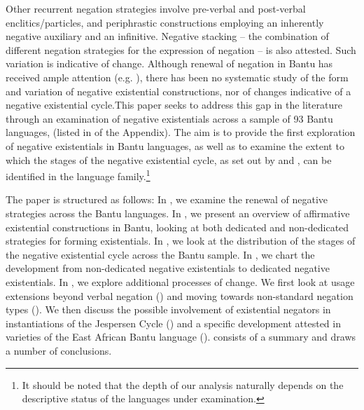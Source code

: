 \documentclass[output=paper,draft,draftmode,colorlinks,citecolor=brown]{langscibook}
\begin{document}
Other recurrent negation strategies involve pre-verbal and post-verbal
enclitics/particles, and periphrastic constructions employing an inherently
negative auxiliary and an infinitive. Negative stacking -- the combination
of different negation strategies for the expression of negation -- is also
attested. Such variation is indicative of change. Although renewal of
negation in Bantu has received ample attention (e.g.
\citealt{KambaMuzenga1981,Guldemann1996,Guldemann1999,DevosAuwera2013,DevosOlmen2013}), there has been no systematic study of the
form and variation of negative existential constructions, nor of changes
indicative of a negative existential cycle.This paper seeks
to address this gap in the literature through an examination of negative
existentials across a sample of 93 Bantu languages, (listed  in  of the Appendix). The aim is to provide
the first exploration of negative existentials in Bantu languages, as well
as to examine the extent to which the stages of the negative existential
cycle, as set out by \citet{Croft1991} and
\citet{Veselinova2016}, can be identified in the
language family.\footnote{It should be noted that the depth of our analysis
naturally depends on the descriptive status of the languages under
examination.}

The paper is structured as follows: In ,
 we examine the renewal of negative strategies across the Bantu languages.
 In , we present an overview of affirmative existential
 constructions in Bantu, looking at both dedicated and non-dedicated
 strategies for forming existentials. In , we look at the
 distribution of the stages of the negative existential cycle across the
 Bantu sample. In , we chart the development from
 non-dedicated negative existentials to dedicated negative existentials. In
 , we explore additional processes of change. We first
 look at usage extensions beyond verbal negation () and
 moving towards non-standard negation types (). We then discuss the possible involvement of existential negators in instantiations of the Jespersen Cycle () and a specific development attested in varieties of the East African Bantu language  ().  consists of a summary and draws a number of conclusions.
\end{document}
